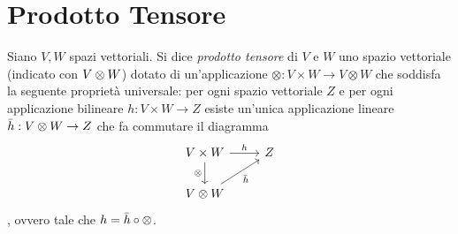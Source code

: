 \section{Prodotto Tensore}

\begin{definition}
Siano $V\comma W$ spazi vettoriali. Si dice \emph{prodotto tensore} di $V$ e $W$ uno spazio vettoriale (indicato con $V\otimes W$) dotato di un'applicazione $\otimes:V\times W\to V\otimes W$ che soddisfa la seguente proprietà universale: per ogni spazio vettoriale $Z$ e per ogni applicazione bilineare $h:V\times W\to Z$ esiste un'unica applicazione lineare $\bar{h}:V\otimes W\to Z$ che fa commutare il diagramma
$$
\begin{tikzcd}
V\times W\arrow[r,"h"]\arrow[d,"\tensor",swap]&Z\\
V\tensor W\arrow[ru,"\bar{h}",swap]
\end{tikzcd}
$$
, ovvero tale che $h=\bar{h}\circ\otimes$.
\end{definition}

